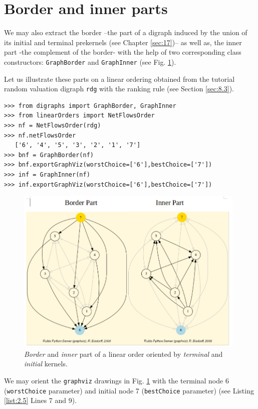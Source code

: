 \section{Border and inner parts}
\label{sec:2.4}

We may also extract the border --the part of a digraph induced by the union of its initial and terminal prekernels (see Chapter \ref{sec:17})--  as well as, the inner part -the complement of the border- with the help of two corresponding class constructors: \texttt{GraphBorder} and \texttt{GraphInner} (see Fig. \ref{fig:2.3}).

Let us illustrate these parts on a linear ordering obtained from the tutorial random valuation digraph \texttt{rdg}  with the \NetFlows ranking rule  (see Section \ref{sec:8.3}).  
\begin{lstlisting}[caption={Border and inner part of a linear order},label=list:2.5]
>>> from digraphs import GraphBorder, GraphInner
>>> from linearOrders import NetFlowsOrder
>>> nf = NetFlowsOrder(rdg)
>>> nf.netFlowsOrder
   ['6', '4', '5', '3', '2', '1', '7']
>>> bnf = GraphBorder(nf)
>>> bnf.exportGraphViz(worstChoice=['6'],bestChoice=['7'])
>>> inf = GraphInner(nf)
>>> inf.exportGraphViz(worstChoice=['6'],bestChoice=['7'])
\end{lstlisting}
\begin{figure}[h]
\includegraphics[width=11cm]{Figures/graphBorderAndInner1.png}
\caption{\emph{Border} and \emph{inner} part of a linear order oriented by \emph{terminal} and \emph{initial} kernels.}
\label{fig:2.3}       %
\end{figure}
We may orient the \texttt{graphviz} drawings in Fig. \ref{fig:2.3}  with the terminal node 6 (\texttt{worstChoice} parameter) and initial node 7 (\texttt{bestChoice} parameter) (see Listing \ref{list:2.5} Lines 7 and 9).

